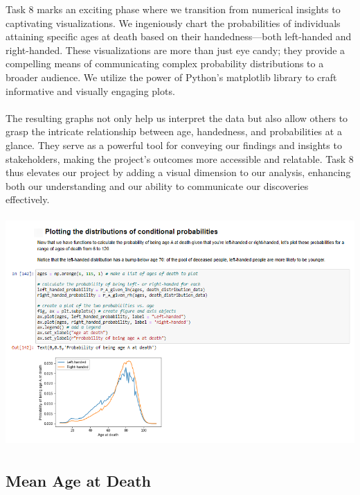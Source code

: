 \documentclass{article}
\begin{document}
Task 8 marks an exciting phase where we transition from numerical insights to captivating visualizations. We ingeniously chart the probabilities of individuals attaining specific ages at death based on their handedness—both left-handed and right-handed. These visualizations are more than just eye candy; they provide a compelling means of communicating complex probability distributions to a broader audience. We utilize the power of Python's matplotlib library to craft informative and visually engaging plots.\\ \\The resulting graphs not only help us interpret the data but also allow others to grasp the intricate relationship between age, handedness, and probabilities at a glance. They serve as a powerful tool for conveying our findings and insights to stakeholders, making the project's outcomes more accessible and relatable. Task 8 thus elevates our project by adding a visual dimension to our analysis, enhancing both our understanding and our ability to communicate our discoveries effectively.


\vspace{0.5cm}
        \begin{center}
            \includegraphics[height=250pt]{8.png}\\
        \end{center}
        
\subsection{Mean Age at Death}
\end{document}
